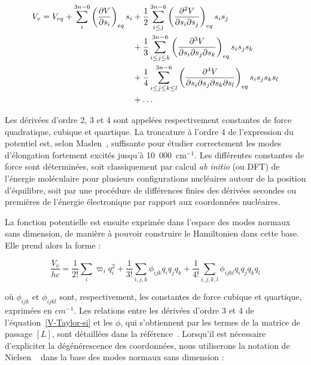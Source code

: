 \begin{align} \label{V-Taylor-si}
V_v = V_{eq} + \sum^{3n-6}_i\left(\frac{\partial V}{\partial s_i}\right)_{eq} s_i &+ \frac{1}{2} \sum^{3n-6}_{i\leq j} \left(\frac{\partial^2 V}{\partial s_i \partial s_j}\right)_{eq} s_i s_j \\ \notag
&+ \frac{1}{3} \sum^{3n-6}_{i\leq j\leq k} \left(\frac{\partial^3 V}{\partial s_i \partial s_j \partial s_k}\right)_{eq} s_i s_j s_k \\ \notag
&+ \frac{1}{4} \sum^{3n-6}_{i\leq j\leq k\leq l} \left(\frac{\partial^4 V}{\partial s_i \partial s_j \partial s_k \partial s_l}\right)_{eq} s_i s_j s_k s_l \\ \notag
&+ \ldots
\end{align}

Les dérivées d'ordre 2, 3 et 4 sont appelées respectivement constantes de force quadratique, cubique et quartique. 
La troncature à l'ordre 4 de l'expression du potentiel est, selon Maslen~\cite{maslen1991higher}, suffisante pour étudier correctement les modes d'élongation fortement excités jusqu'à 10~000~cm$^{-1}$.
Les différentes constantes de force sont déterminées, soit classiquement par calcul \textit{ab initio} (ou DFT) de l'énergie moléculaire pour plusieurs configurations nucléaires autour de la position d'équilibre, soit par une procédure de différences finies des dérivées secondes ou premières de l'énergie électronique par rapport aux coordonnées nucléaires.

La fonction potentielle est ensuite exprimée dans l'espace des modes normaux sans dimension, de manière à pouvoir construire le Hamiltonien dans cette base. Elle prend alors la forme :

\begin{equation}
\frac{V_v}{hc} = \frac{1}{2!} \sum_i \varpi_i q^2_i + \frac{1}{3!} \sum_{i,j,k} \phi_{ijk}q_i q_j q_k + \frac{1}{4!} \sum_{i,j,k,l} \phi_{ijkl}q_i q_j q_k q_l
\end{equation}

\noindent où $\phi_{ijk}$ et $\phi_{ijkl}$ sont, respectivement, les constantes de force cubique et quartique, exprimées en $cm^{-1}$. Les relations entre les dérivées d'ordre 3 et 4 de l'équation~\ref{V-Taylor-si} et les $\phi$, qui s'obtiennent par les termes de la matrice de passage $[L]$, sont détaillées dans la référence~\cite{hoy1972anharmonic}.
Lorsqu'il est nécessaire d'expliciter la dégénérescence des coordonnées, nous utiliserons la notation de Nielsen ~\cite{nielsen1951vibration} dans la base des modes normaux sans dimension :

